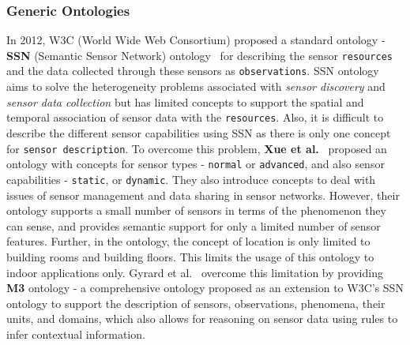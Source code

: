 \documentclass{elsart}  %
\begin{document}
\subsubsection{Generic Ontologies}
In 2012, W3C (World Wide Web Consortium) proposed a standard ontology - \textbf{SSN} (Semantic Sensor Network) ontology~\cite{ssn2012} for describing the sensor \texttt{resources} and the data collected through these sensors as \texttt{observations}. SSN ontology aims to solve the heterogeneity problems associated with \textit{sensor discovery} and \textit{sensor data collection} but has limited concepts to support the spatial and temporal association of sensor data with the \texttt{resources}. Also, it is difficult to describe the different sensor capabilities using SSN as there is only one concept for \texttt{sensor description}. To overcome this problem, \textbf{Xue et al.}~\cite{xue2015ontology} proposed an ontology with concepts for sensor types - \texttt{normal} or \texttt{advanced}, and also sensor capabilities - \texttt{static}, or \texttt{dynamic}. They also introduce concepts to deal with issues of sensor management and data sharing in sensor networks. However, their ontology supports a small number of sensors in terms of the phenomenon they can sense, and provides semantic support for only a limited number of sensor features. Further, in the ontology, the concept of location is only limited to building rooms and building floors. This limits the usage of this ontology to indoor applications only. Gyrard et al.~\cite{gyrard2014enrich,gyrard2014standardizing} overcome this limitation by providing \textbf{M3} ontology - a comprehensive ontology proposed as an extension to W3C's SSN ontology to support the description of sensors, observations, phenomena, their units, and domains, which also allows for reasoning on sensor data using rules to infer contextual information.
 
\end{document}
